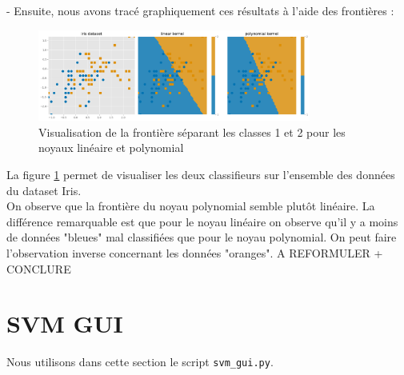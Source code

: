 \documentclass[a4paper,12pt]{article}
\begin{document}
- Ensuite, nous avons tracé graphiquement ces résultats à l'aide des frontières : \\
\begin{figure}[H]
    \centering
    \includegraphics[width=0.8\textwidth]{Images/linear_vs_poly.png}
    \caption{Visualisation de la frontière séparant les classes 1 et 2 pour les noyaux linéaire et polynomial}
    \label{fig:compare}
\end{figure}

La figure \ref{fig:compare} permet de visualiser les deux classifieurs sur l'ensemble des données du dataset Iris.\\
On observe que la frontière du noyau polynomial semble plutôt linéaire.
La différence remarquable est que pour le noyau linéaire on observe qu'il y a moins de données "bleues" mal classifiées que pour le noyau polynomial.
On peut faire l'observation inverse concernant les données "oranges".
A REFORMULER + CONCLURE 

\section{SVM GUI}

Nous utilisons dans cette section le script \texttt{svm\_gui.py}.
\end{document}

